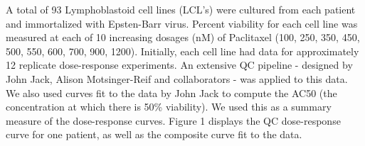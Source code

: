 \documentclass[12pt]{article}
\begin{document}
A total of 93 Lymphoblastoid cell lines (LCL's) were cultured from each patient and immortalized with Epsten-Barr virus. Percent viability for each cell line was measured at each of 10 increasing dosages (nM) of Paclitaxel (100, 250, 350, 450, 500, 550, 600, 700, 900, 1200). Initially, each cell line had data for approximately 12 replicate dose-response experiments.  An extensive QC pipeline - designed by John Jack, Alison Motsinger-Reif and collaborators - was applied to this data.  We also used curves fit to the data by John Jack to compute the AC50 (the concentration at which there is 50\% viability).  We used this as a summary measure of the dose-response curves. Figure 1 displays the QC dose-response curve for one patient, as well as the composite curve fit to the data. \\
\end{document}
